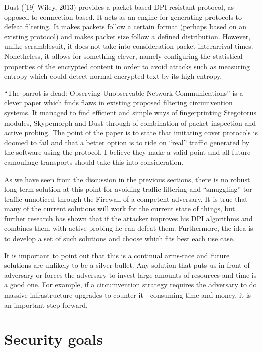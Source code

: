 \documentclass[11pt]{article} %
\begin{document}
Dust ([19] Wiley, 2013) provides a packet based DPI resistant protocol, as opposed to connection based. It acts as an engine for generating protocols to defeat filtering. It makes packets follow a certain format (perhaps based on an existing protocol) and makes packet size follow a defined distribution. However, unlike scramblesuit, it does not take into consideration packet interarrival times. Nonetheless, it allows for something clever, namely configuring the statistical properties of the encrypted content in order to avoid attacks such as measuring entropy which could detect normal encrypted text by its high entropy.

“The parrot is dead: Observing Unobservable Network Communications” is a clever paper which finds flaws in existing proposed filtering circumvention systems. It managed to find efficient and simple ways of fingerprinting Stegotorus modules, Skypemorph and Dust through of combination of packet inspection and active probing. The point of the paper is to state that imitating cover protocols is doomed to fail and that a better option is to ride on “real” traffic generated by the software using the protocol. I believe they make a valid point and all future camouflage transports should take this into consideration.


As we have seen from the discussion in the previous sections, there is no robust long-term solution at this point for avoiding traffic filtering and “smuggling” tor traffic unnoticed through the Firewall of a competent adversary. It is true that many of the current solutions will work for the current state of things, but further research has shown that if the attacker improves his DPI algorithms and combines them with active probing he can defeat them. Furthermore, the idea is to develop a set of such solutions and choose which fits best each use case.

It is important to point out  that this is a continual arms-race and future solutions are unlikely to be a silver bullet. Any solution that puts us in front of adversary or forces the adversary to invest large amounts of resources and time is a good one. For example, if a circumvention strategy requires the adversary to do massive infrastructure upgrades to counter it - consuming time and money, it is an important step forward.

\section{Security goals}
\end{document}
